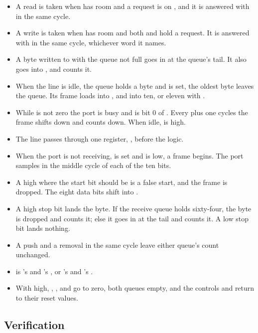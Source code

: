 \begin{itemize}
\item A read is taken when  has room and a request is on
, and it is answered with  in the same cycle.
\item A write is taken when  has room and both
 and  hold a request. It is answered with
 in the same cycle, whichever word it names.
\item A byte written to  with the queue not full goes in
at the queue's tail. It also goes into , and 
counts it.
\item When the line is idle, the queue holds a byte and 
is set, the oldest byte leaves the queue. Its frame loads into
, and  into ten, or eleven with .
\item While  is not zero the port is busy and  is
bit 0 of . Every  plus one cycles the frame
shifts down and  counts down. When idle,  is high.
\item The  line passes through one register, ,
before the logic.
\item When the port is not receiving,  is set and
 is low, a frame begins. The port samples  in
the middle cycle of each of the ten bits.
\item A high where the start bit should be is a false start, and the
frame is dropped. The eight data bits shift into .
\item A high stop bit lands the byte. If the receive queue holds
sixty-four, the byte is dropped and  counts it; else it goes
in at the tail and  counts it. A low stop bit lands
nothing.
\item A push and a removal in the same cycle leave either queue's
count unchanged.
\item {} is 's  and 's
, or 's  and 's .
\item With  high, , ,
 and  go to zero, both queues empty, and
the controls and  return to their reset values.
\end{itemize}

\subsection*{Verification}

